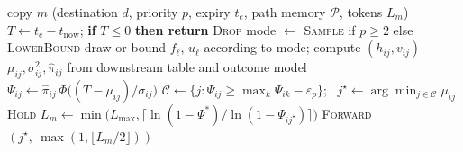 \begin{algorithm}[t]
\caption{STAR next-hop decision at node $i$ for a message copy $m$}
\label{alg:decide}
\begin{algorithmic}[1]
\Require copy $m$ (destination $d$, priority $p$, expiry $t_e$, path memory $\mathcal{P}$, tokens $L_m$)
\State $T \gets t_e - t_{\text{now}}$; \textbf{if} $T\le 0$ \textbf{then return} \textsc{Drop}
\State mode $\gets$ \textsc{Sample} if $p\ge 2$ else \textsc{LowerBound}
  \State draw or bound $f_\ell$, $u_\ell$ according to mode; compute $(h_{ij},v_{ij})$ 
  \State $\mu_{ij},\sigma^2_{ij},\hat\pi_{ij}$ from downstream table and outcome model 
  \State $\Psi_{ij}\gets\hat\pi_{ij}\,\Phi\big((T-\mu_{ij})/\sigma_{ij}\big)$
\EndFor
\State $\mathcal{C}\gets\{j:\Psi_{ij}\ge\max_k\Psi_{ik}-\varepsilon_p\}$; \ $j^\star\gets\arg\min_{j\in\mathcal{C}}\mu_{ij}$
  \State \Return \textsc{Hold} 
\EndIf
{}
  \State $L_m\gets\min\!\big(L_{\max},\lceil\ln(1-\Psi^\ast)/\ln(1-\Psi_{ij^\star})\rceil\big)$ 
\EndIf
\State \Return \textsc{Forward}$(j^\star,\ \max(1,\lfloor L_m/2\rfloor))$
\end{algorithmic}
\end{algorithm}
